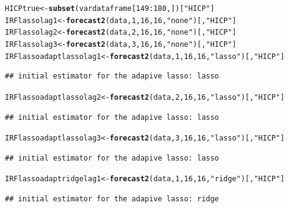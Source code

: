 \documentclass[11pt,oneside, a4paper]{amsart}\usepackage[]{graphicx}\usepackage[]{color}
\makeatletter
\newcommand{\hlnum}[1]{\textcolor[rgb]{0.686,0.059,0.569}{#1}}%
\newcommand{\hlstr}[1]{\textcolor[rgb]{0.192,0.494,0.8}{#1}}%
\newcommand{\hlopt}[1]{\textcolor[rgb]{0,0,0}{#1}}%
\newcommand{\hlstd}[1]{\textcolor[rgb]{0.345,0.345,0.345}{#1}}%
\newcommand{\hlkwb}[1]{\textcolor[rgb]{0.69,0.353,0.396}{#1}}%
\newcommand{\hlkwd}[1]{\textcolor[rgb]{0.737,0.353,0.396}{\textbf{#1}}}%
\newenvironment{kframe}{%
 \def\at@end@of@kframe{}%
 \ifinner\ifhmode%
  \def\at@end@of@kframe{\end{minipage}}%
  \begin{minipage}{\columnwidth}%
 \fi\fi%
 \def\FrameCommand##1{\hskip\@totalleftmargin \hskip-\fboxsep
 \colorbox{shadecolor}{##1}\hskip-\fboxsep
     \hskip-\linewidth \hskip-\@totalleftmargin \hskip\columnwidth}%
 \MakeFramed {\advance\hsize-\width
   \@totalleftmargin\z@ \linewidth\hsize
   \@setminipage}}%
 {\par\unskip\endMakeFramed%
 \at@end@of@kframe}
\newenvironment{knitrout}{}{} %
\makeatother
\begin{document}
\begin{knitrout}
\color{fgcolor}\begin{kframe}
\begin{alltt}
\hlstd{HICPtrue}\hlkwb{<-}\hlkwd{subset}\hlstd{(vardataframe[}\hlnum{149}\hlopt{:}\hlnum{180}\hlstd{,])[}\hlstr{"HICP"}\hlstd{]}
\hlstd{IRFlassolag1}\hlkwb{<-}\hlkwd{forecast2}\hlstd{(data,}\hlnum{1}\hlstd{,}\hlnum{16}\hlstd{,}\hlnum{16}\hlstd{,}\hlstr{"none"}\hlstd{)[,}\hlstr{"HICP"}\hlstd{]}
\hlstd{IRFlassolag2}\hlkwb{<-}\hlkwd{forecast2}\hlstd{(data,}\hlnum{2}\hlstd{,}\hlnum{16}\hlstd{,}\hlnum{16}\hlstd{,}\hlstr{"none"}\hlstd{)[,}\hlstr{"HICP"}\hlstd{]}
\hlstd{IRFlassolag3}\hlkwb{<-}\hlkwd{forecast2}\hlstd{(data,}\hlnum{3}\hlstd{,}\hlnum{16}\hlstd{,}\hlnum{16}\hlstd{,}\hlstr{"none"}\hlstd{)[,}\hlstr{"HICP"}\hlstd{]}
\hlstd{IRFlassoadaptlassolag1}\hlkwb{<-}\hlkwd{forecast2}\hlstd{(data,}\hlnum{1}\hlstd{,}\hlnum{16}\hlstd{,}\hlnum{16}\hlstd{,}\hlstr{"lasso"}\hlstd{)[,}\hlstr{"HICP"}\hlstd{]}
\end{alltt}
\begin{verbatim}
## initial estimator for the adapive lasso: lasso
\end{verbatim}
\begin{alltt}
\hlstd{IRFlassoadaptlassolag2}\hlkwb{<-}\hlkwd{forecast2}\hlstd{(data,}\hlnum{2}\hlstd{,}\hlnum{16}\hlstd{,}\hlnum{16}\hlstd{,}\hlstr{"lasso"}\hlstd{)[,}\hlstr{"HICP"}\hlstd{]}
\end{alltt}
\begin{verbatim}
## initial estimator for the adapive lasso: lasso
\end{verbatim}
\begin{alltt}
\hlstd{IRFlassoadaptlassolag3}\hlkwb{<-}\hlkwd{forecast2}\hlstd{(data,}\hlnum{3}\hlstd{,}\hlnum{16}\hlstd{,}\hlnum{16}\hlstd{,}\hlstr{"lasso"}\hlstd{)[,}\hlstr{"HICP"}\hlstd{]}
\end{alltt}
\begin{verbatim}
## initial estimator for the adapive lasso: lasso
\end{verbatim}
\begin{alltt}
\hlstd{IRFlassoadaptridgelag1}\hlkwb{<-}\hlkwd{forecast2}\hlstd{(data,}\hlnum{1}\hlstd{,}\hlnum{16}\hlstd{,}\hlnum{16}\hlstd{,}\hlstr{"ridge"}\hlstd{)[,}\hlstr{"HICP"}\hlstd{]}
\end{alltt}
\begin{verbatim}
## initial estimator for the adapive lasso: ridge
\end{verbatim}
\begin{alltt}

\end{alltt}
\end{kframe}
\end{knitrout}
\end{document}
